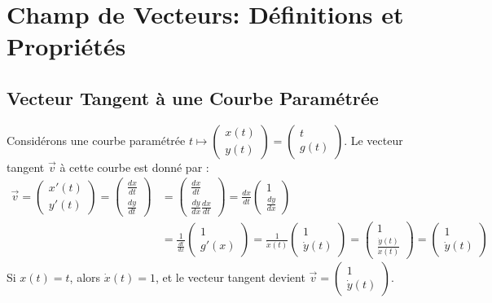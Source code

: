 \documentclass{article}
\begin{document}
\section{Champ de Vecteurs: Définitions et Propriétés}

\subsection{Vecteur Tangent à une Courbe Paramétrée}

Considérons une courbe paramétrée $t \mapsto \begin{pmatrix} x(t) \\ y(t) \end{pmatrix} = \begin{pmatrix} t \\ g(t) \end{pmatrix}$. Le vecteur tangent $\vec{v}$ à cette courbe est donné par :
\begin{align*}
\vec{v} = \begin{pmatrix} x'(t) \\ y'(t) \end{pmatrix} = \begin{pmatrix} \frac{dx}{dt} \\ \frac{dy}{dt} \end{pmatrix} &= \begin{pmatrix} \frac{dx}{dt} \\ \frac{dy}{dx} \frac{dx}{dt} \end{pmatrix} = \frac{dx}{dt} \begin{pmatrix} 1 \\ \frac{dy}{dx} \end{pmatrix} \\
&= \frac{1}{\frac{dt}{dx}} \begin{pmatrix} 1 \\ g'(x) \end{pmatrix} = \frac{1}{\dot{x}(t)} \begin{pmatrix} 1 \\ \dot{y}(t) \end{pmatrix} = \begin{pmatrix} 1 \\ \frac{\dot{y}(t)}{\dot{x}(t)} \end{pmatrix} =  \begin{pmatrix} 1 \\ \dot{y}(t) \end{pmatrix}
\end{align*}
Si $x(t) = t$, alors $\dot{x}(t) = 1$, et le vecteur tangent devient $\vec{v} = \begin{pmatrix} 1 \\ \dot{y}(t) \end{pmatrix}$.
\end{document}
